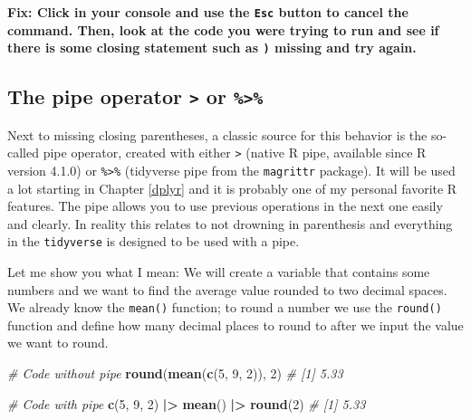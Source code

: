 \documentclass[
]{book}
\newenvironment{Shaded}{\begin{snugshade}}{\end{snugshade}}
\newcommand{\CommentTok}[1]{\textcolor[rgb]{0.56,0.35,0.01}{\textit{#1}}}
\newcommand{\DecValTok}[1]{\textcolor[rgb]{0.00,0.00,0.81}{#1}}
\newcommand{\FunctionTok}[1]{\textcolor[rgb]{0.13,0.29,0.53}{\textbf{#1}}}
\newcommand{\NormalTok}[1]{#1}
\newcommand{\SpecialCharTok}[1]{\textcolor[rgb]{0.81,0.36,0.00}{\textbf{#1}}}
\begin{document}
\textbf{Fix: Click in your console and use the \texttt{Esc} button to cancel the command. Then, look at the code you were trying to run and see if there is some closing statement such as \texttt{)} missing and try again.}

\subsection*{\texorpdfstring{The pipe operator \texttt{\textbar{}\textgreater{}} or \texttt{\%\textgreater{}\%}}{The pipe operator \textbar\textgreater{} or \%\textgreater\%}}\label{pipe1}

Next to missing closing parentheses, a classic source for this behavior is the so-called pipe operator, created with either \texttt{\textbar{}\textgreater{}} (native R pipe, available since R version 4.1.0) or \texttt{\%\textgreater{}\%} (tidyverse pipe from the \texttt{magrittr} package).
It will be used a lot starting in Chapter \ref{dplyr} and it is probably one of my personal favorite R features.
The pipe allows you to use previous operations in the next one easily and clearly.
In reality this relates to not drowning in parenthesis and everything in the \texttt{tidyverse} is designed to be used with a pipe.

Let me show you what I mean: We will create a variable that contains some numbers and we want to find the average value rounded to two decimal spaces.
We already know the \texttt{mean()} function; to round a number we use the \texttt{round()} function and define how many decimal places to round to after we input the value we want to round.

\begin{Shaded}
\begin{Highlighting}[]
\CommentTok{\# Code without pipe}
\FunctionTok{round}\NormalTok{(}\FunctionTok{mean}\NormalTok{(}\FunctionTok{c}\NormalTok{(}\DecValTok{5}\NormalTok{, }\DecValTok{9}\NormalTok{, }\DecValTok{2}\NormalTok{)), }\DecValTok{2}\NormalTok{)}
\CommentTok{\# [1] 5.33}

\CommentTok{\# Code with pipe}
\FunctionTok{c}\NormalTok{(}\DecValTok{5}\NormalTok{, }\DecValTok{9}\NormalTok{, }\DecValTok{2}\NormalTok{) }\SpecialCharTok{|\textgreater{}} \FunctionTok{mean}\NormalTok{() }\SpecialCharTok{|\textgreater{}} \FunctionTok{round}\NormalTok{(}\DecValTok{2}\NormalTok{)}
\CommentTok{\# [1] 5.33}
\end{Highlighting}
\end{Shaded}
\end{document}
